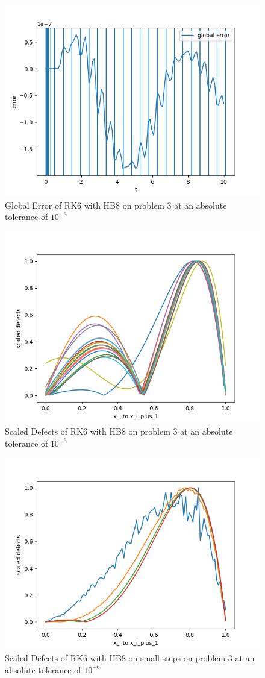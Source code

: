 \documentclass{article}
\begin{document}
\begin{figure}[H]
\centering
\includegraphics[width=0.7\linewidth]{./figures/rk6_with_hb8_p3_global_error}
\caption{Global Error of RK6 with HB8 on problem 3 at an absolute tolerance of $10^{-6}$}
\label{fig:rk6_with_hb8_p3_global_error}
\end{figure}

\begin{figure}[H]
\centering
\includegraphics[width=0.7\linewidth]{./figures/rk6_with_hb8_p3_scaled_defects}
\caption{Scaled Defects of RK6 with HB8 on problem 3 at an absolute tolerance of $10^{-6}$}
\label{fig:rk6_with_hb8_p3_scaled_defects}
\end{figure}

\begin{figure}[H]
\centering
\includegraphics[width=0.7\linewidth]{./figures/rk6_with_hb8_p3_scaled_defects_small_steps}
\caption{Scaled Defects of RK6 with HB8 on small steps on problem 3 at an absolute tolerance of $10^{-6}$}
\label{fig:rk6_with_hb8_p3_scaled_defects_small_steps}
\end{figure}
\end{document}
